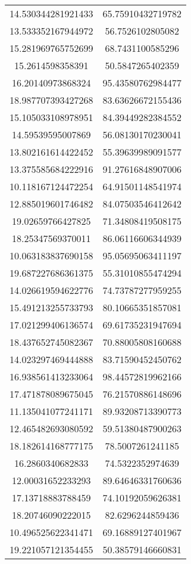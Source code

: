 \begin{table}
\begin{tabular}{cc}
14.530344281921433 & 65.75910432719782 \\
13.533352167944972 & 56.7526102805082 \\
15.281969765752699 & 68.7431100585296 \\
15.2614598358391 & 50.5847265402359 \\
16.20140973868324 & 95.43580762984477 \\
18.987707393427268 & 83.63626672155436 \\
15.105033108978951 & 84.39449282384552 \\
14.59539595007869 & 56.08130170230041 \\
13.802161614422452 & 55.39639989091577 \\
13.375585684222916 & 91.27616848907006 \\
10.118167124472254 & 64.91501148541974 \\
12.885019601746482 & 84.07503546412642 \\
19.02659766427825 & 71.34808419508175 \\
18.25347569370011 & 86.06116606344939 \\
10.063183837690158 & 95.05695063411197 \\
19.687227686361375 & 55.31010855474294 \\
14.026619594622776 & 74.73787277959255 \\
15.491213255733793 & 80.10665351857081 \\
17.021299406136574 & 69.61735231947694 \\
18.437652745082367 & 70.88005808160688 \\
14.023297469444888 & 83.71590452450762 \\
16.938561413233064 & 98.44572819962166 \\
17.471878089675045 & 76.21570886148696 \\
11.135041077241171 & 89.93208713390773 \\
12.465482693080592 & 59.51380487900263 \\
18.182614168777175 & 78.5007261241185 \\
16.2860340682833 & 74.5322352974639 \\
12.00031652233293 & 89.64646331760636 \\
17.13718883788459 & 74.10192059626381 \\
18.20746090222015 & 82.6296244859436 \\
10.496525622341471 & 69.16889127401967 \\
19.221057121354455 & 50.38579146660831 \\

\end{tabular}
\end{table}
